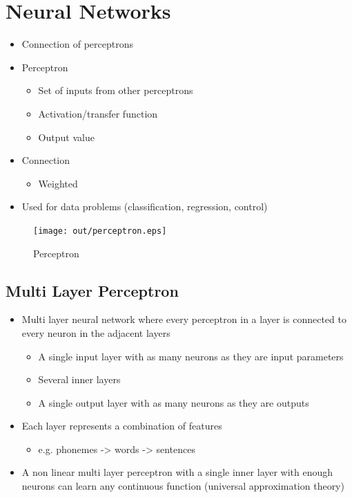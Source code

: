 \documentclass[a4paper]{article}
\begin{document}
\section{Neural Networks}
\label{sec:nn}

\begin{itemize}
  \item Connection of perceptrons
  \item Perceptron
    \begin{itemize}
      \item Set of inputs from other perceptrons
      \item Activation/transfer function
      \item Output value
    \end{itemize}
  \item Connection
    \begin{itemize}
      \item Weighted
    \end{itemize}
  \item Used for data problems (classification, regression, control)
\end{itemize}

\begin{figure}[h!]
  \centering
  \texttt{[image: out/perceptron.eps]}
  \caption{Perceptron}
  \label{fig:perceptron}
\end{figure}
\FloatBarrier

\subsection{Multi Layer Perceptron}

\begin{itemize}
  \item Multi layer neural network where every perceptron in a layer is
        connected to every neuron in the adjacent layers
    \begin{itemize}
      \item A single input layer with as many neurons as they are input
            parameters
      \item Several inner layers
      \item A single output layer with as many neurons as they are outputs
    \end{itemize}
  \item Each layer represents a combination of features
    \begin{itemize}
      \item e.g. phonemes -> words -> sentences
    \end{itemize}
  \item A non linear multi layer perceptron with a single inner layer with
        enough neurons can learn any continuous function (universal
        approximation theory)
\end{itemize}
\end{document}
